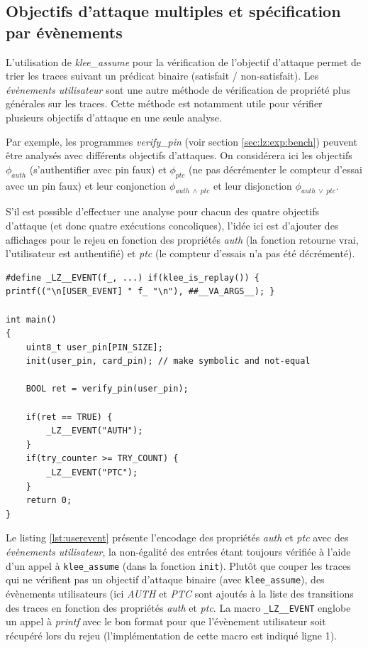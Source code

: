         \subsection{Objectifs d'attaque multiples et spécification par évènements}
        \label{sec:userevent}
        
            L'utilisation de \textit{klee\_assume} pour la vérification de l'objectif d'attaque permet de trier les traces suivant un prédicat binaire (satisfait / non-satisfait).
            Les \textit{évènements utilisateur} sont une autre méthode de vérification de propriété plus générales sur les traces.
            Cette méthode est notamment utile pour vérifier plusieurs objectifs d'attaque en une seule analyse.
            
            Par exemple, les programmes \textit{verify\_pin} (voir section \ref{sec:lz:exp:bench}) peuvent être analysés avec différents objectifs d'attaques.
            On considérera ici les objectifs $\phi_{auth}$ (s'authentifier avec \gls{pin} faux) et $\phi_{ptc}$ (ne pas décrémenter le compteur d'essai avec un \gls{pin} faux) et leur conjonction $\phi_{auth~\land~ptc}$ et leur disjonction $\phi_{auth~\lor~ptc}$.
            
            S'il est possible d'effectuer une analyse pour chacun des quatre objectifs d'attaque (et donc quatre exécutions concoliques), l'idée ici est d'ajouter des affichages pour le rejeu en fonction des propriétés \textit{auth} (la fonction retourne vrai, l'utilisateur est authentifié) et \textit{ptc} (le compteur d'essais n'a pas été décrémenté). 
            
\begin{lstlisting}    
#define _LZ__EVENT(f_, ...) if(klee_is_replay()) { printf(("\n[USER_EVENT] " f_ "\n"), ##__VA_ARGS__); }

int main()
{
    uint8_t user_pin[PIN_SIZE];
    init(user_pin, card_pin); // make symbolic and not-equal

    BOOL ret = verify_pin(user_pin);

    if(ret == TRUE) {
        _LZ__EVENT("AUTH");
    }
    if(try_counter >= TRY_COUNT) {
        _LZ__EVENT("PTC");
    }
    return 0;
}
\end{lstlisting}
    
            Le listing \ref{lst:userevent} présente l'encodage des propriétés \textit{auth} et \textit{ptc} avec des \textit{évènements utilisateur}, la non-égalité des entrées étant toujours vérifiée à l'aide d'un appel à \texttt{klee\_assume} (dans la fonction \texttt{init}).
            Plutôt que couper les traces qui ne vérifient pas un objectif d'attaque binaire (avec \texttt{klee\_assume}), des évènements utilisateurs (ici \textit{AUTH} et \textit{PTC} sont ajoutés à la liste des transitions des traces en fonction des propriétés \textit{auth} et \textit{ptc}.
            La macro \texttt{\_LZ\_\_EVENT} englobe un appel à \textit{printf} avec le bon format pour que l'évènement utilisateur soit récupéré lors du rejeu (l'implémentation de cette macro est indiqué ligne 1). 
            
